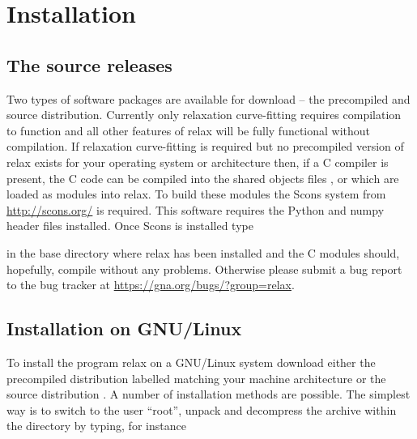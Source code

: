 
\section{Installation}


\subsection{The source releases}
\label{sect: source releases}

Two types of software packages are available for download -- the precompiled and source distribution.
Currently only relaxation curve-fitting requires compilation to function and all other features of relax will be fully functional without compilation.
If relaxation curve-fitting is required but no precompiled version of relax exists for your operating system or architecture then, if a C compiler is present, the C code can be compiled into the shared objects files ,  or  which are loaded as modules into relax.
To build these modules the Scons system from \href{http://scons.org/}{http://scons.org/} is required.
This software requires the Python and numpy header files installed.
Once Scons is installed type


in the base directory where relax has been installed and the C modules should, hopefully, compile without any problems.
Otherwise please submit a bug report to the bug tracker at \href{https://gna.org/bugs/?group=relax}{https://gna.org/bugs/?group=relax}.



\subsection{Installation on GNU/Linux}

To install the program relax on a GNU/Linux system download either the precompiled distribution labelled  matching your machine architecture or the source distribution .
A number of installation methods are possible.
The simplest way is to switch to the user ``root'', unpack and decompress the archive within the  directory by typing, for instance

